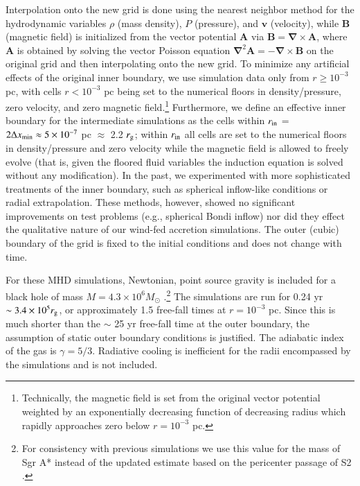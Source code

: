 \documentclass[twocolumn,twocolappendix,apjl,appendixfloats]{aastex63}
\begin{document}
Interpolation onto the new grid is done using the nearest neighbor method for the hydrodynamic variables $\rho$ (mass density), $ P$ (pressure), and $\mathbf{v}$ (velocity), while $\mathbf{B}$ (magnetic field) is initialized from the vector potential  $\mathbf{A}$ via $\mathbf{B} = \mathbf{\nabla} \times \mathbf{A}$, where $\mathbf{A}$ is obtained by solving the vector Poisson equation $\mathbf{\nabla}^2 \mathbf{A} = - \mathbf{\nabla} \times \mathbf{B}$ on the original grid and then interpolating onto the new grid.  To minimize any artificial effects of the original inner boundary, we use simulation data only from $r \ge 10^{-3}$ pc, with cells $r <10^{-3}$ pc being set to the numerical floors in density/pressure, zero velocity, and zero magnetic field.\footnote{Technically, the magnetic field is set from the original vector potential weighted by an exponentially decreasing function of decreasing radius which rapidly approaches zero below $r  = 10^{-3}$ pc.}  
 Furthermore, we define an effective inner boundary for the intermediate simulations as the cells within $r_{\rm in}$ = $2  \Delta x_{\rm min} \approx 5 \times 10^{-7} $ pc $\approx$ 2.2 $r_{\rm g}$; within $r_{\rm in}$ all cells are set to the numerical floors in density/pressure and zero velocity while the magnetic field is allowed to freely evolve (that is, given the floored fluid variables the induction equation is solved without any modification).  In the past, we experimented with more sophisticated treatments of the inner boundary, such as spherical inflow-like conditions or radial extrapolation. These methods, however, showed no significant improvements on test problems (e.g., spherical Bondi inflow) nor did they effect the qualitative nature of our wind-fed accretion simulations.  The outer (cubic) boundary of the grid is fixed to the initial conditions and does not change with time. 
  
For these MHD simulations, Newtonian, point source gravity is included for a black hole of mass $M = 4.3 \times 10^{6} M_\odot$ \citep{Gillessen2017}.\footnote{For consistency with previous simulations we use this value for the mass of Sgr A* instead of the updated estimate based on the pericenter passage of S2 \citep{GravityS2}.  } 
 The simulations are run for 0.24 yr $\sim 3.4 \times 10^5 r_{\rm g}$, or approximately 1.5 free-fall times at $r = 10^{-3}$ pc.   Since this is much shorter than the $\sim$ 25 yr free-fall time at the outer boundary, the assumption of static outer boundary conditions is justified. The adiabatic index of the gas is $\gamma=5/3$.  Radiative cooling is inefficient for the radii encompassed by the simulations and is not included.
\end{document}
